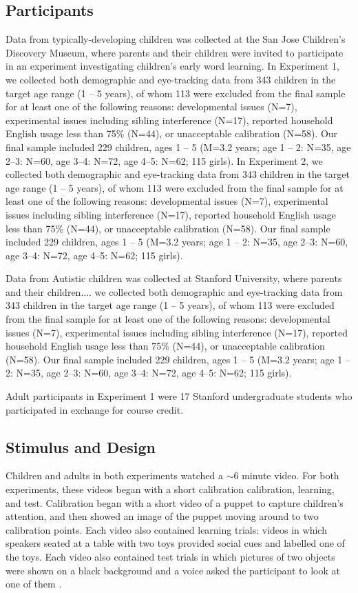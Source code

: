 \documentclass{pnastwo}
\begin{document}
\begin{article}
\begin{materials}
\subsection{Participants} Data from typically-developing children was collected at the San Jose Children's Discovery Museum, where parents and their children were invited to participate in an experiment investigating children's early word learning. In Experiment 1, we collected both demographic and eye-tracking data from 343 children in the target age range (1 -- 5 years), of whom 113 were excluded from the final sample for at least one of the following reasons: developmental issues (N=7), experimental issues including sibling interference (N=17), reported household English usage less than 75\% (N=44), or unacceptable calibration (N=58). Our final sample included 229 children, ages 1 -- 5 (M=3.2 years; age 1 -- 2: N=35, age 2--3: N=60, age 3--4: N=72, age 4--5: N=62; 115 girls). In Experiment 2, we collected both demographic and eye-tracking data from 343 children in the target age range (1 -- 5 years), of whom 113 were excluded from the final sample for at least one of the following reasons: developmental issues (N=7), experimental issues including sibling interference (N=17), reported household English usage less than 75\% (N=44), or unacceptable calibration (N=58). Our final sample included 229 children, ages 1 -- 5 (M=3.2 years; age 1 -- 2: N=35, age 2--3: N=60, age 3--4: N=72, age 4--5: N=62; 115 girls).

Data from Autistic children was collected at Stanford University, where parents and their children.... we collected both demographic and eye-tracking data from 343 children in the target age range (1 -- 5 years), of whom 113 were excluded from the final sample for at least one of the following reasons: developmental issues (N=7), experimental issues including sibling interference (N=17), reported household English usage less than 75\% (N=44), or unacceptable calibration (N=58). Our final sample included 229 children, ages 1 -- 5 (M=3.2 years; age 1 -- 2: N=35, age 2--3: N=60, age 3--4: N=72, age 4--5: N=62; 115 girls).

Adult participants in Experiment 1 were 17 Stanford undergraduate students who participated in exchange for course credit.

\subsection{Stimulus and Design} Children and adults in both experiments watched a $\sim$6 minute video. For both experiments, these videos began with a short calibration calibration, learning, and test. Calibration began with a short video of a puppet to capture children's attention, and then showed an image of the puppet moving around to two calibration points. Each video also contained learning trials: videos in which speakers seated at a table with two toys provided social cues and labelled one of the toys. Each video also contained test trials in which pictures of two objects were shown on a black background and a voice asked the participant to look at one of them \cite[as in][]{fernald1998}.


\end{materials}
\end{article}
\end{document}
